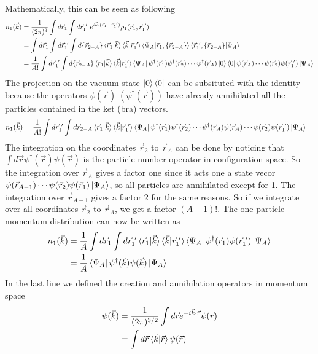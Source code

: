 \documentclass[12pt]{article}
\begin{document}
Mathematically, this can be seen as following
\begin{align}
n_1(\vec{k}) & =\frac{1}{(2\pi)^3}\int d\vec{r}_1 \int d\vec{r}_1^{\ \prime}\  e^{i\vec{k}\cdot (\vec{r}_1-\vec{r}^{\ \prime}_1)}\rho_1(\vec{r}_1,\vec{r}_1^{\ \prime}) \\
& =\int d\vec{r}_1 \int d\vec{r}_1^{\ \prime}  \int d\{\vec{r}_{2-A}\} \braket{\vec{r}_1| \vec{k}} \braket{\vec{k}| \vec{r}_1^{\ \prime}} \braket{\Psi_A | \vec{r}_1, \{ \vec{r}_{2-A}\} } \braket{\vec{r}_1^{\ \prime}, \{ \vec{r}_{2-A}\}|\Psi_A  } \\
& = \frac{1}{A!} \int d\vec{r}_1^{\ \prime}  \int d\{\vec{r}_{2-A}\} \braket{\vec{r}_1| \vec{k}} \braket{\vec{k}| \vec{r}_1^{\ \prime}} \bra{\Psi_A} \psi^\dagger(\vec{r}_1) \psi^\dagger(\vec{r}_2) \cdots \psi^\dagger(\vec{r}_A) \ket{0} \bra{0} \psi(\vec{r}_A) \cdots \psi(\vec{r}_2) \psi(\vec{r}_1^{\ \prime}) \ket{\Psi_A}
\end{align}
The projection on the vacuum state $\ket{0} \bra{0}$ can be subsituted with the identity because the operators $\psi(\vec{r}) \; (\psi^\dagger(\vec{r}))$ have already annihilated all the particles contained in the ket (bra) vectors.
\begin{align}
n_1(\vec{k}) & = \frac{1}{A!} \int d\vec{r}_1^{\ \prime}  \int d{\vec{r}_{2-A}} \braket{\vec{r}_1| \vec{k}} \braket{\vec{k}| \vec{r}_1^{\ \prime}} \bra{\Psi_A} \psi^\dagger(\vec{r}_1) \psi^\dagger(\vec{r}_2) \cdots \psi^\dagger(\vec{r}_A) \psi(\vec{r}_A) \cdots \psi(\vec{r}_2) \psi(\vec{r}_1^{\ \prime}) \ket{\Psi_A}
\end{align}
The integration on the coordinates $\vec{r}_2$ to $\vec{r}_A$ can be done by noticing that $\int d\vec{r} \psi^\dagger(\vec{r}) \psi(\vec{r})$ is the particle number operator in configuration space. So the integration over $\vec{r}_A$ gives a factor one since it acts one a state vecor $\psi(\vec{r}_{A-1}) \cdots \psi(\vec{r}_2) \psi(\vec{r}_1) \ket{\Psi_A}$, so all particles are annihilated except for 1. The integration over $\vec{r}_{A-1}$ gives a factor 2 for the same reasons. So if we integrate over all coordinates $\vec{r}_2$ to $\vec{r}_A$, we get a factor $(A-1)!$.  The one-particle momentum distribution can now be written as
\begin{align}
n_1(\vec{k}) & = \frac{1}{A}  \int d\vec{r}_1\int d\vec{r}_1^{\ \prime}  \braket{\vec{r}_1| \vec{k}} \braket{\vec{k}| \vec{r}_1^{\ \prime}} \bra{\Psi_A} \psi^\dagger(\vec{r}_1) \psi(\vec{r}_1^{\ \prime}) \ket{\Psi_A} \\
& = \frac{1}{A}  \bra{\Psi_A} \psi^\dagger(\vec{k}) \psi(\vec{k}) \ket{\Psi_A} 
\end{align}
In the last line we defined the creation and annihilation operators in momentum space
\begin{align}
\psi(\vec{k}) & = \frac{1}{(2\pi)^{3/2}} \int d\vec{r} e^{-i\vec{k} \cdot \vec{r}} \psi(\vec{r}) \\
& = \int d\vec{r} \braket{\vec{k}| \vec{r}}  \psi(\vec{r}) 
\end{align}
\end{document}
